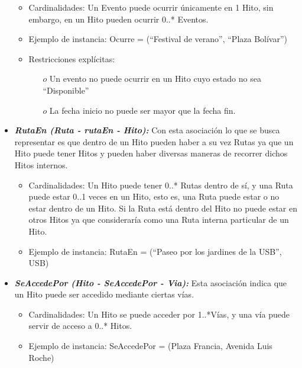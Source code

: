 \documentclass[a4paper]{article}
\begin{document}
\begin{itemize}
{\begin{itemize}
\begin{itemize}
\end{itemize}
 \item Cardinalidades: Un Evento puede ocurrir únicamente en 1 Hito, sin embargo, en un Hito
pueden ocurrir 0..* Eventos.  

\item Ejemplo de instancia: Ocurre = {(“Festival de verano”, “Plaza Bolívar”)} 
 \item Restricciones explícitas:
 
 \begin{itemize}
\item[$o$] Un evento no puede ocurrir en un Hito cuyo estado no sea “Disponible”
\item[$o$] La fecha inicio no puede ser mayor que la fecha fin.
\end{itemize}
   \end{itemize}


}


\item{

	\textbf{\textit{RutaEn (Ruta - rutaEn - Hito):}} Con esta asociación lo que se busca representar es que dentro de un Hito pueden haber a su vez Rutas ya que un Hito puede tener Hitos y pueden haber diversas maneras de recorrer dichos Hitos internos.
        
        
 \begin{itemize}
        
  \item Cardinalidades: Un Hito puede tener 0..* Rutas dentro de sí, y una Ruta puede estar 0..1 veces en un Hito, esto es, una Ruta puede estar o no estar dentro de un Hito. Si la Ruta está dentro del Hito no puede estar en otros Hitos ya que consideraría como una Ruta interna particular de un Hito.
\item Ejemplo de instancia: RutaEn = {(“Paseo por los jardines de la USB”, USB)}
   \end{itemize}


}





\item{

	\textbf{\textit{SeAccedePor (Hito - SeAccedePor - Via): }}Esta asociación indica que un Hito puede ser accedido mediante ciertas vías.
  		
        
        
 \begin{itemize}
        
  \item Cardinalidades: Un Hito se puede acceder por 1..*Vías, y una vía puede servir de acceso a 0..* Hitos.
 \item Ejemplo de instancia: SeAccedePor = {(Plaza Francia, Avenida Luis Roche)}
   \end{itemize}


}
\end{itemize}
\end{document}

